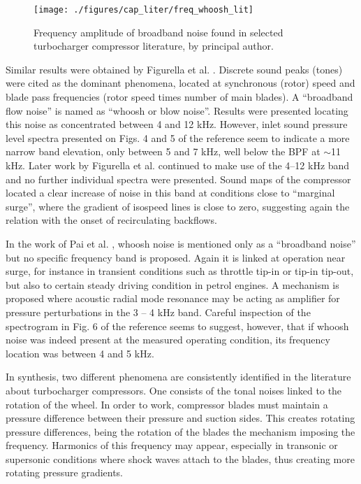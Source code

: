 \begin{wrapfigure}{O}[1.5cm]{0.4\textwidth}
\centering
\vspace{-5mm}
\texttt{[image: ./figures/cap\_liter/freq\_whoosh\_lit]}
\caption{Frequency amplitude of broadband noise found in selected turbocharger compressor literature, by principal author.}
\label{fig:freq_whoosh_lit}
\end{wrapfigure}

Similar results were obtained by Figurella et al. \cite{figurella2012noise}. Discrete sound peaks (tones) were cited as the dominant phenomena, located at synchronous (rotor) speed and blade pass frequencies (rotor speed times number of main blades). A ``broadband flow noise'' is named as ``whoosh or blow noise''. Results were presented locating this noise as concentrated between 4 and 12 kHz. However, inlet sound pressure level spectra presented on Figs. 4 and 5 of the reference seem to indicate a more narrow band elevation, only between 5 and 7 kHz, well below the BPF at $\sim$11 kHz. Later work by Figurella et al. \cite{figurella2014effect} continued to make use of the 4--12 kHz band and no further individual spectra were presented. Sound maps of the compressor located a clear increase of noise in this band at conditions close to ``marginal surge'', where the gradient of isospeed lines is close to zero, suggesting again the relation with the onset of recirculating backflows.

In the work of Pai et al. \cite{pai2015turbocharger}, whoosh noise is mentioned only as a ``broadband noise'' but no specific frequency band is proposed. Again it is linked at operation near surge, for instance in transient conditions such as throttle tip-in or tip-in tip-out, but also to certain steady driving condition in petrol engines. A mechanism is proposed where acoustic radial mode resonance may be acting as amplifier for pressure perturbations in the 3 -- 4 kHz band. Careful inspection of the spectrogram in Fig. 6 of the reference seems to suggest, however, that if whoosh noise was indeed present at the measured operating condition, its frequency location was between 4 and 5 kHz.

In synthesis, two different phenomena are consistently identified in the literature about turbocharger compressors. One consists of the tonal noises linked to the rotation of the wheel. In order to work, compressor blades must maintain a pressure difference between their pressure and suction sides. This creates rotating pressure differences, being the rotation of the blades the mechanism imposing the frequency. Harmonics of this frequency may appear, especially in transonic or supersonic conditions where shock waves attach to the blades, thus creating more rotating pressure gradients.

